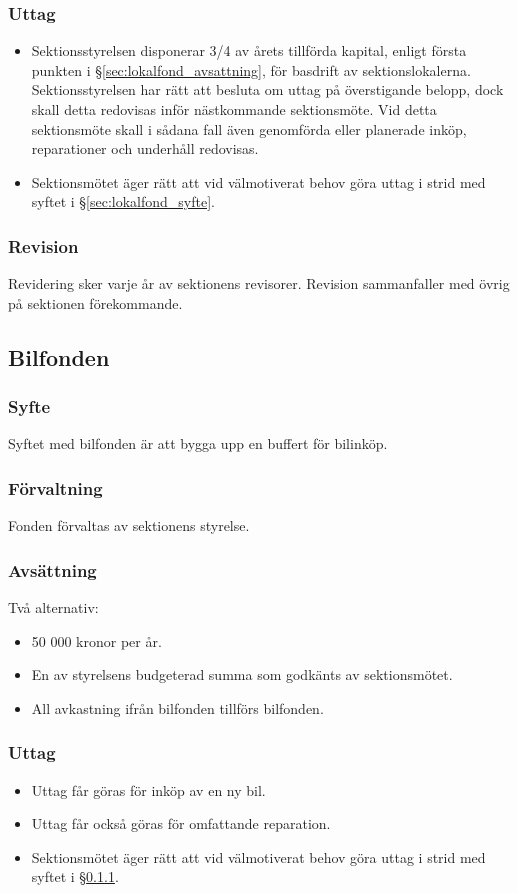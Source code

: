 \documentclass[a4paper, 10pt]{article}
\begin{document}
\subsubsection{Uttag}
\begin{itemize}
\item Sektionsstyrelsen disponerar 3/4 av årets tillförda kapital,
enligt första punkten i \S\ref{sec:lokalfond_avsattning}, för basdrift av sektionslokalerna. Sektionsstyrelsen har rätt att besluta om uttag på överstigande belopp, dock skall detta redovisas inför nästkommande sektionsmöte. Vid detta sektionsmöte skall i sådana fall även genomförda eller planerade inköp, reparationer och underhåll redovisas.
\item Sektionsmötet äger rätt att vid välmotiverat behov göra uttag i strid med syftet i \S\ref{sec:lokalfond_syfte}.
\end{itemize}
\subsubsection{Revision}
Revidering sker varje år av sektionens revisorer. Revision
sammanfaller med övrig på sektionen förekommande.

\subsection{Bilfonden}
\subsubsection{Syfte}
\label{sec:bilfond_syfte}
Syftet med bilfonden är att bygga upp en buffert för bilinköp.
\subsubsection{Förvaltning}
Fonden förvaltas av sektionens styrelse.
\subsubsection{Avsättning}
Två alternativ:
\begin{itemize}
\item 50 000 kronor per år.
\item En av styrelsens budgeterad summa som godkänts av sektionsmötet.
\item All avkastning ifrån bilfonden tillförs bilfonden.
\end{itemize}
\subsubsection{Uttag}
\begin{itemize}
\item Uttag får göras för inköp av en ny bil.
\item Uttag får också göras för omfattande reparation.
\item Sektionsmötet äger rätt att vid välmotiverat behov göra uttag i strid med syftet i \S\ref{sec:bilfond_syfte}.
\end{itemize}
\end{document}
